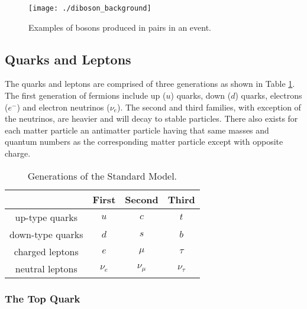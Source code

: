 \begin{figure}[h!]
  \centering
	\texttt{[image: ./diboson\_background]}
\caption[Diboson production]{\label{fig:diboson}{ Examples of bosons produced in pairs in an event. }} 
\end{figure}	
	


\subsection{Quarks and Leptons}

The quarks and leptons are comprised of three generations as shown in Table \ref{tab:generations}.  The first generation of fermions include up ($u$) quarks, down ($d$) quarks, electrons ($e^{-}$) and electron neutrinos ($\nu_{e}$).  The second and third families, with exception of the neutrinos, are heavier and will decay to stable particles.  There also exists for each matter particle an antimatter particle having that same masses and quantum numbers as the corresponding matter particle except with opposite charge.  \\

\begin{table}[!htb]
	\centering
	\caption{Generations of the Standard Model.}
	\begin{tabular}{c||c|c|c|}
		\hline 
			&	First	&	Second		&	Third \\
		\hline \hline
		up-type quarks	&	$u$ 	 &	$c$ &	$t$	\\
		down-type	 quarks &	$d$ &	$s$ &	$b$	\\
		charged leptons 	& $e$	&	$\mu$	&	$\tau$ \\
		neutral leptons	&	 $\nu_e$	& $\nu_{\mu}$	&	$\nu_{\tau}$	\\
		\hline \hline			
	\end{tabular}
	\label{tab:generations}
\end{table}		



		
	
	
	\subsubsection{The Top Quark}
	
